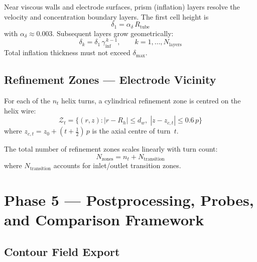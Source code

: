 \documentclass[11pt,a4paper]{article}
\begin{document}
Near viscous walls and electrode surfaces, prism (inflation) layers resolve the
velocity and concentration boundary layers.  The first cell height is
\begin{equation}\label{eq:first_cell}
  \delta_1 = \alpha_\delta\,R_{\mathrm{tube}}
\end{equation}
with $\alpha_\delta \approx 0.003$.  Subsequent layers grow geometrically:
\begin{equation}\label{eq:inflation_growth}
  \delta_k = \delta_1\,\gamma_{\mathrm{inf}}^{\,k-1}, \qquad
  k = 1, \ldots, N_{\mathrm{layers}}
\end{equation}
Total inflation thickness must not exceed $\delta_{\max}$.

\subsection{Refinement Zones — Electrode Vicinity}

For each of the $n_t$ helix turns, a cylindrical refinement zone is centred
on the helix wire:
\begin{equation}\label{eq:refine_zone}
  \mathcal{Z}_t = \bigl\{(r, z) :
    |r - R_h| \le d_w,\;
    |z - z_{c,t}| \le 0.6\,p
  \bigr\}
\end{equation}
where $z_{c,t} = z_0 + (t + \tfrac{1}{2})\,p$ is the axial centre of turn~$t$.

The total number of refinement zones scales linearly with turn count:
\begin{equation}\label{eq:n_zones}
  N_{\mathrm{zones}} = n_t + N_{\mathrm{transition}}
\end{equation}
where $N_{\mathrm{transition}}$ accounts for inlet/outlet transition zones.

\section{Phase 5 — Postprocessing, Probes, and Comparison Framework}
\label{sec:phase5}

\subsection{Contour Field Export}
\end{document}
